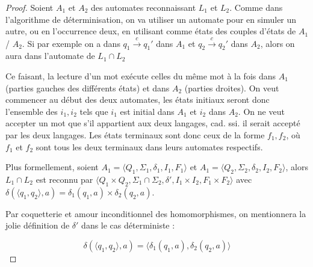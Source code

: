 \begin{proof}
Soient $A_1$ et $A_2$ des automates reconnaissant $L_1$ et $L_2$. Comme dans l'algorithme de déterminisation, on va utiliser un automate pour en simuler un autre, ou en l'occurrence deux, en utilisant comme états des couples d'états de $A_1$ / $A_2$. Si par exemple on a dans $q_1 \xrightarrow{c} q_1'$ dans $A_1$ et $q_2 \xrightarrow{c} q_2'$ dans $A_2$, alors on aura dans l'automate de $L_1 \cap L_2$


\begin{figure}[H]
\centering
{}
\end{figure}

Ce faisant, la lecture d'un mot exécute celles du même mot à la fois dans $A_1$ (parties gauches des différents états) et dans $A_2$ (parties droites). On veut commencer au début des deux automates, les états initiaux seront donc l'ensemble des $i_1,i_2$ tels que $i_1$ est initial dans $A_1$ et $i_2$ dans $A_2$. On ne veut accepter un mot que s'il appartient aux deux langages, cad. ssi. il serait accepté par les deux langages. Les états terminaux sont donc ceux de la forme $f_1, f_2$, où $f_1$ et $f_2$ sont tous les deux terminaux dans leurs automates respectifs.

Plus formellement, soient $A_1 = \big \langle Q_1, \Sigma_1, \delta_1, I_1, F_1\big \rangle$ et $A_1 = \big \langle Q_2, \Sigma_2, \delta_2, I_2, F_2\big \rangle$, alors $L_1 \cap L_2$ est reconnu par $\big \langle Q_1 \times Q_2, \Sigma_1 \cap \Sigma_2, \delta', I_1 \times I_2, F_1 \times F_2\big \rangle$ avec $\delta(\big \langle q_1, q_2 \big \rangle,a) = \delta_1(q_1,a) \times \delta_2(q_2,a)$.

Par coquetterie et amour inconditionnel des homomorphismes, on mentionnera la jolie définition de $\delta'$ dans le cas déterministe :

\[
\delta(\big \langle q_1, q_2 \big \rangle,a) = \big \langle \delta_1(q_1,a), \delta_2(q_2,a) \big \rangle
\]

\end{proof}

